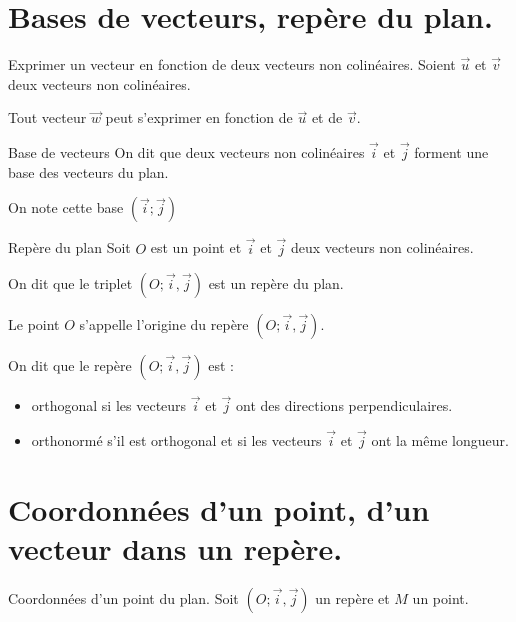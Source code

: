 \begin{pageCours} %


\section{Bases de vecteurs, repère du plan.}

\begin{PpT}{Exprimer un vecteur en fonction de deux vecteurs non colinéaires.}
Soient $\vec{u}$ et $\vec{v}$ deux vecteurs non colinéaires.

Tout vecteur $\vec{w}$ peut s'exprimer en fonction de $\vec{u}$ et de $\vec{v}$.
\end{PpT}

\begin{DefT}{Base de vecteurs}
On dit que deux vecteurs non colinéaires $\vec{i}$ et $\vec{j}$ forment une base des vecteurs du plan.

On note cette base $(\vec{i};\vec{j})$
\end{DefT}

\begin{DefT}{Repère du plan}
Soit $O$ est un point et $\vec{i}$ et $\vec{j}$ deux vecteurs non colinéaires.

On dit que le triplet $(O;\vec{i},\vec{j})$ est un repère du plan.

Le point $O$ s'appelle l'origine du repère $(O;\vec{i},\vec{j})$.
\end{DefT}

\begin{Def}
On dit que le repère $(O;\vec{i},\vec{j})$ est :
\begin{itemize}
\item orthogonal si les vecteurs $\vec{i}$ et $\vec{j}$ ont des directions perpendiculaires.
\item orthonormé s'il est orthogonal et si les vecteurs $\vec{i}$ et $\vec{j}$ ont la même longueur.
\end{itemize}
\end{Def}

\section{Coordonnées d'un point, d'un vecteur dans un repère.}

\begin{DefT}{Coordonnées d'un point du plan.}
Soit $(O;\vec{i},\vec{j})$ un repère et $M$ un point.


\end{DefT}
\end{pageCours}
